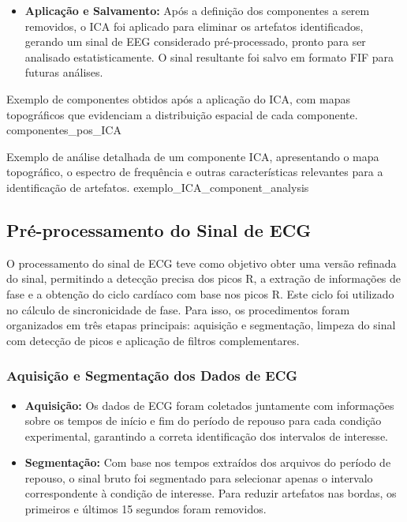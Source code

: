 \begin{itemize}
    \item \textbf{Aplicação e Salvamento:} Após a definição dos componentes a serem removidos, o ICA foi aplicado para eliminar os artefatos identificados, gerando um sinal de EEG considerado pré-processado, pronto para ser analisado estatisticamente. O sinal resultante foi salvo em formato FIF para futuras análises.
\end{itemize}


{Exemplo de componentes obtidos após a aplicação do ICA, com mapas topográficos que evidenciam a distribuição espacial de cada componente.}
{componentes_pos_ICA}

{Exemplo de análise detalhada de um componente ICA, apresentando o mapa topográfico, o espectro de frequência e outras características relevantes para a identificação de artefatos.}
{exemplo_ICA_component_analysis}


\subsection{Pré-processamento do Sinal de ECG}
\label{subsec:preprocess_ecg}

O processamento do sinal de ECG teve como objetivo obter uma versão refinada do sinal, permitindo a detecção precisa dos picos R, a extração de informações de fase e a obtenção do ciclo cardíaco com base nos picos R. Este ciclo foi utilizado no cálculo de sincronicidade de fase. Para isso, os procedimentos foram organizados em três etapas principais: aquisição e segmentação, limpeza do sinal com detecção de picos e aplicação de filtros complementares.

\subsubsection{Aquisição e Segmentação dos Dados de ECG}
\begin{itemize}
    \item \textbf{Aquisição:} Os dados de ECG foram coletados juntamente com informações sobre os tempos de início e fim do período de repouso para cada condição experimental, garantindo a correta identificação dos intervalos de interesse.
    \item \textbf{Segmentação:} Com base nos tempos extraídos dos arquivos do período de repouso, o sinal bruto foi segmentado para selecionar apenas o intervalo correspondente à condição de interesse. Para reduzir artefatos nas bordas, os primeiros e últimos 15 segundos foram removidos.
\end{itemize}

